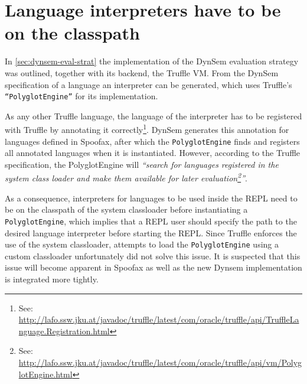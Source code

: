 \section{Language interpreters have to be on the classpath}
\label{sec:classpath}

In \cref{sec:dynsem-eval-strat} the implementation of the DynSem evaluation
strategy was outlined, together with its backend, the Truffle VM.  From the
DynSem specification of a language an interpreter can be generated, which uses
Truffle's \texttt{``PolyglotEngine''} for its implementation.

As any other Truffle language, the language of the interpreter has to be
registered with Truffle by annotating it correctly\footnote{See:
\url{http://lafo.ssw.jku.at/javadoc/truffle/latest/com/oracle/truffle/api/TruffleLanguage.Registration.html}}.
DynSem generates this annotation for languages defined in Spoofax, after which
the \texttt{PolyglotEngine} finds and registers all annotated languages when it
is instantiated. However, according to the Truffle specification, the
PolyglotEngine will \textit{``search for languages registered in the system class
loader and make them available for later evaluation\footnote{See:
\url{http://lafo.ssw.jku.at/javadoc/truffle/latest/com/oracle/truffle/api/vm/PolyglotEngine.html}}''}.

As a consequence, interpreters for languages to be used inside the REPL need to
be on the classpath of the system classloader before instantiating a
\texttt{PolyglotEngine}, which implies that a REPL user should specify the path to
the desired language interpreter before starting the REPL. Since Truffle
enforces the use of the system classloader, attempts to load the
\texttt{PolyglotEngine} using a custom classloader unfortunately did not solve this
issue. It is suspected that this issue will become apparent in Spoofax as well as the new
Dynsem implementation is integrated more tightly.

